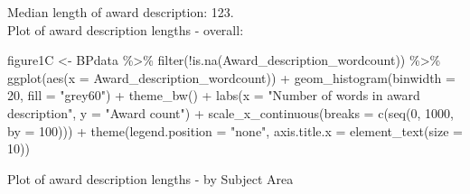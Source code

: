 \documentclass[
]{article}
\newenvironment{Shaded}{\begin{snugshade}}{\end{snugshade}}
\newcommand{\AttributeTok}[1]{\textcolor[rgb]{0.77,0.63,0.00}{#1}}
\newcommand{\DecValTok}[1]{\textcolor[rgb]{0.00,0.00,0.81}{#1}}
\newcommand{\FunctionTok}[1]{\textcolor[rgb]{0.00,0.00,0.00}{#1}}
\newcommand{\NormalTok}[1]{#1}
\newcommand{\OtherTok}[1]{\textcolor[rgb]{0.56,0.35,0.01}{#1}}
\newcommand{\SpecialCharTok}[1]{\textcolor[rgb]{0.00,0.00,0.00}{#1}}
\newcommand{\StringTok}[1]{\textcolor[rgb]{0.31,0.60,0.02}{#1}}
\begin{document}
Median length of award description: 123.\\
Plot of award description lengths - overall:

\begin{Shaded}
\begin{Highlighting}[]
\NormalTok{figure1C }\OtherTok{\textless{}{-}}\NormalTok{ BPdata }\SpecialCharTok{\%\textgreater{}\%} 
  \FunctionTok{filter}\NormalTok{(}\SpecialCharTok{!}\FunctionTok{is.na}\NormalTok{(Award\_description\_wordcount)) }\SpecialCharTok{\%\textgreater{}\%}
  \FunctionTok{ggplot}\NormalTok{(}\FunctionTok{aes}\NormalTok{(}\AttributeTok{x =}\NormalTok{ Award\_description\_wordcount)) }\SpecialCharTok{+} 
  \FunctionTok{geom\_histogram}\NormalTok{(}\AttributeTok{binwidth =} \DecValTok{20}\NormalTok{, }\AttributeTok{fill =} \StringTok{"grey60"}\NormalTok{) }\SpecialCharTok{+}
  \FunctionTok{theme\_bw}\NormalTok{() }\SpecialCharTok{+} 
  \FunctionTok{labs}\NormalTok{(}\AttributeTok{x =} \StringTok{"Number of words in award description"}\NormalTok{, }\AttributeTok{y =} \StringTok{"Award count"}\NormalTok{) }\SpecialCharTok{+} 
  \FunctionTok{scale\_x\_continuous}\NormalTok{(}\AttributeTok{breaks =} \FunctionTok{c}\NormalTok{(}\FunctionTok{seq}\NormalTok{(}\DecValTok{0}\NormalTok{, }\DecValTok{1000}\NormalTok{, }\AttributeTok{by =} \DecValTok{100}\NormalTok{))) }\SpecialCharTok{+}
  \FunctionTok{theme}\NormalTok{(}\AttributeTok{legend.position =} \StringTok{"none"}\NormalTok{, }\AttributeTok{axis.title.x =} \FunctionTok{element\_text}\NormalTok{(}\AttributeTok{size =} \DecValTok{10}\NormalTok{))}
\end{Highlighting}
\end{Shaded}

Plot of award description lengths - by Subject Area
\end{document}
